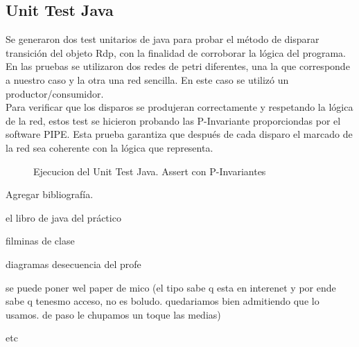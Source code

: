 \documentclass[10pt, a4paper,notitlepage]{article}
\begin{document}
\subsection{Unit Test Java}
Se generaron dos test unitarios de java para probar el método de disparar transición del objeto Rdp, con la finalidad de corroborar la lógica del programa. En las pruebas se utilizaron dos redes de petri diferentes, una la que corresponde a nuestro caso y la otra una red sencilla. En este caso se utilizó un productor/consumidor.\\
Para verificar que los disparos se produjeran correctamente y respetando la lógica de la red, estos test se hicieron probando las P-Invariante proporciondas por el software PIPE. Esta prueba garantiza que después de cada disparo el marcado de la red sea coherente con la lógica que representa.
\begin{figure}[H] %
	\caption{Ejecucion del Unit Test Java. Assert con P-Invariantes}
	\label{fig:test_rdp_ok}
\end{figure}

\begin{thebibliography}{100} %

Agregar bibliografía.

el libro de java del práctico

filminas de clase

diagramas desecuencia del profe

se puede poner wel paper de mico (el tipo sabe q esta en interenet y por ende sabe q tenesmo acceso, no es boludo. quedariamos bien admitiendo que lo usamos. de paso le chupamos un toque las medias)

etc


\end{thebibliography}
\end{document}
